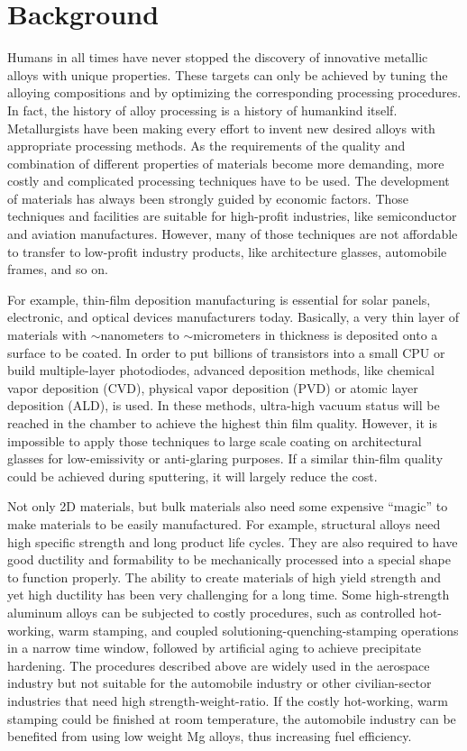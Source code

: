 \section{Background}

Humans in all times have never stopped the discovery of innovative metallic alloys with unique properties. These targets can only be achieved by tuning the alloying compositions and by optimizing the corresponding processing procedures. In fact, the history of alloy processing is a history of humankind itself. Metallurgists have been making every effort to invent new desired alloys with appropriate processing methods. As the requirements of the quality and combination of different properties of materials become more demanding, more costly and complicated processing techniques have to be used. The development of materials has always been strongly guided by economic factors. Those techniques and facilities are suitable for high-profit industries, like semiconductor and aviation manufactures. However, many of those techniques are not affordable to transfer to low-profit industry products, like architecture glasses, automobile frames, and so on.

For example, thin-film deposition manufacturing is essential for solar panels, electronic, and optical devices manufacturers today. Basically, a very thin layer of materials with $\sim$nanometers to $\sim$micrometers in thickness is deposited onto a surface to be coated. In order to put billions of transistors into a small CPU or build multiple-layer photodiodes, advanced deposition methods, like chemical vapor deposition (CVD), physical vapor deposition (PVD) or atomic layer deposition (ALD), is used. In these methods, ultra-high vacuum status will be reached in the chamber to achieve the highest thin film quality. However, it is impossible to apply those techniques to large scale coating on architectural glasses for low-emissivity or anti-glaring purposes. If a similar thin-film quality could be achieved during sputtering, it will largely reduce the cost.

Not only 2D materials, but bulk materials also need some expensive ``magic'' to make materials to be easily manufactured. For example, structural alloys need high specific strength and long product life cycles. They are also required to have good ductility and formability to be mechanically processed into a special shape to function properly. The ability to create materials of high yield strength and yet high ductility has been very challenging for a long time. Some high-strength aluminum alloys can be subjected to costly procedures, such as controlled hot-working, warm stamping, and coupled solutioning-quenching-stamping operations in a narrow time window, followed by artificial aging to achieve precipitate hardening. The procedures described above are widely used in the aerospace industry but not suitable for the automobile industry or other civilian-sector industries that need high strength-weight-ratio. If the costly hot-working, warm stamping could be finished at room temperature, the automobile industry can be benefited from using low weight Mg alloys, thus increasing fuel efficiency.

